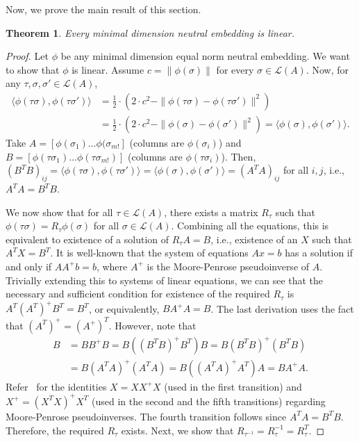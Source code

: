 \documentclass[10pt,letterpaper]{article}
\newcommand{\calL}{{\mathcal{L}}}
\newcommand{\rank}{{\calL(A)}}
\newtheorem{theorem}{Theorem}
\begin{document}
Now, we prove the main result of this section.
\begin{theorem}
Every minimal dimension neutral embedding is linear.
\label{thm:neutral-linear}
\end{theorem}
\begin{proof}
Let $\phi$ be any minimal dimension equal norm neutral embedding. We want to show that $\phi$ is linear. Assume $c = \|\phi(\sigma)\|$ for every $\sigma \in \rank$. Now, for any $\tau,\sigma,\sigma' \in \rank$,
\begin{align*}
\langle \phi(\tau \sigma), \phi(\tau \sigma') \rangle &= \frac{1}{2} \cdot \left(2\cdot c^2 - \|\phi(\tau \sigma) - \phi(\tau \sigma')\|^2\right) \\
&= \frac{1}{2} \cdot \left(2\cdot c^2 - \|\phi(\sigma) - \phi(\sigma')\|^2\right) = \langle \phi(\sigma), \phi(\sigma') \rangle.
\end{align*}
Take $A = [\phi(\sigma_1) \ldots \phi(\sigma_{m!}]$ (columns are $\phi(\sigma_i)$) and $B = [\phi(\tau \sigma_1) \ldots \phi(\tau \sigma_{m!})]$ (columns are $\phi(\tau \sigma_i)$). Then, $(B^T B)_{ij} = \langle \phi(\tau \sigma), \phi(\tau \sigma') \rangle = \langle \phi(\sigma), \phi(\sigma') \rangle = (A^T A)_{ij}$ for all $i,j$, i.e., $A^T A = B^T B$. 

We now show that for all $\tau \in \rank$, there exists a matrix $R_{\tau}$ such that $\phi(\tau \sigma) = R_{\tau} \phi(\sigma)$ for all $\sigma \in \rank$. Combining all the equations, this is equivalent to existence of a solution of $R_{\tau} A = B$, i.e., existence of an $X$ such that $A^T X = B^T$. It is well-known that the system of equations $Ax=b$ has a solution if and only if $AA^{+}b = b$, where $A^{+}$ is the Moore-Penrose pseudoinverse of $A$. Trivially extending this to systems of linear equations, we can see that the necessary and sufficient condition for existence of the required $R_{\tau}$ is $A^T (A^T)^{+} B^T = B^T$, or equivalently, $B A^{+} A = B$. The last derivation uses the fact that $(A^T)^{+} = (A^{+})^T$. However, note that
\begin{align*}
B &= B B^{+} B = B \left( (B^T B)^{+} B^T \right) B = B (B^T B)^{+} \left( B^T B \right) \\
&= B (A^T A)^{+} \left( A^T A \right) = B \left( (A^T A)^{+} A^T \right) A = B A^{+} A.
\end{align*}
Refer~\cite{BH12} for the identities $X = X X^{+} X$ (used in the first transition) and $X^{+} = (X^T X)^{+} X^T$ (used in the second and the fifth transitions) regarding Moore-Penrose pseudoinverses. The fourth transition follows since $A^T A = B^T B$. Therefore, the required $R_{\tau}$ exists. Next, we show that $R_{\tau^{-1}} = R_{\tau}^{-1} = R_{\tau}^T$. 
\end{proof}
\end{document}
